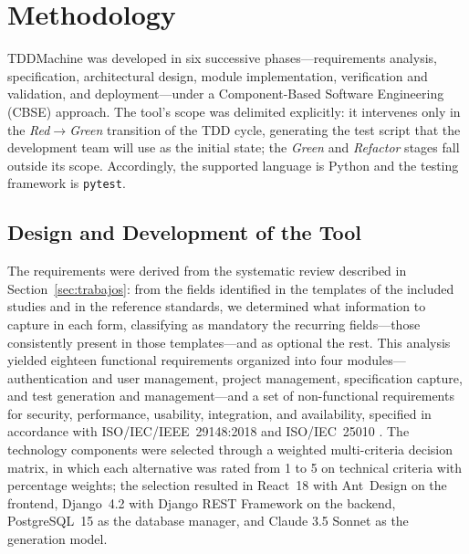 \documentclass[10pt,journal,twoside,letterpaper]{IEEEtran}
\begin{document}
    \section{Methodology}
    \label{sec:metodologia}
    
    TDDMachine was developed in six successive phases---requirements analysis, specification, architectural design, module implementation, verification and validation, and deployment---under a Component-Based Software Engineering (CBSE) approach. The tool's scope was delimited explicitly: it intervenes only in the \emph{Red}$\rightarrow$\emph{Green} transition of the TDD cycle, generating the test script that the development team will use as the initial state; the \emph{Green} and \emph{Refactor} stages fall outside its scope. Accordingly, the supported language is Python and the testing framework is \texttt{pytest}.
    
    \subsection{Design and Development of the Tool}
    \label{subsec:desarrollo}
    
    The requirements were derived from the systematic review described in Section~\ref{sec:trabajos}: from the fields identified in the templates of the included studies and in the reference standards, we determined what information to capture in each form, classifying as mandatory the recurring fields---those consistently present in those templates---and as optional the rest. This analysis yielded eighteen functional requirements organized into four modules---authentication and user management, project management, specification capture, and test generation and management---and a set of non-functional requirements for security, performance, usability, integration, and availability, specified in accordance with ISO/IEC/IEEE~29148:2018 and ISO/IEC~25010 \cite{iso29148}. The technology components were selected through a weighted multi-criteria decision matrix, in which each alternative was rated from 1 to 5 on technical criteria with percentage weights; the selection resulted in React~18 with Ant~Design on the frontend, Django~4.2 with Django REST Framework on the backend, PostgreSQL~15 as the database manager, and Claude 3.5 Sonnet as the generation model.
    
\end{document}
